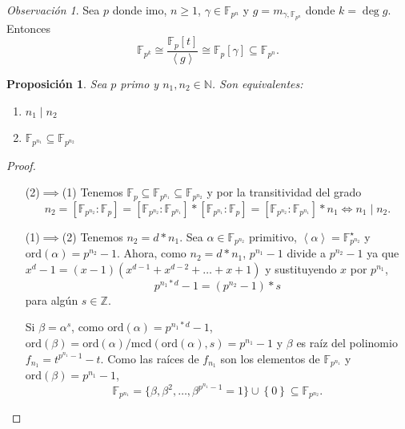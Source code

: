 \documentclass[10pt, spanish]{report}
\newtheorem{prop}[tma]{Proposición}
\theoremstyle{definition}
\theoremstyle{custom}
\theoremstyle{remark}
\newtheorem*{obs}{Observación}
\newcommand{\N}{\mathbb{N}}
\newcommand{\Z}{\mathbb{Z}}
\newcommand{\F}{\mathbb{F}}
\newcommand{\ord}[1]{\text{ord}(#1)}
\newcommand{\mcd}[1]{\text{mcd}(#1)}
\renewcommand{\geq}{\geqslant}
\newcommand{\fecha}[1]{\marginpar{\underline{\footnotesize{#1}}}}
\begin{document}
\fecha{22/03}
\begin{obs}
    Sea $p$ donde imo, $n\geq1$, $\gamma\in\F_{p^n}$ y $g=m_{\gamma,\F_{p^n}}$
    donde $k=\deg{g}$. Entonces \[\F_{p^k}\cong\frac{\F_p[t]}{\left< g \right>}
        \cong\F_p[\gamma]\subseteq\F_{p^n}.\]
\end{obs}

\begin{prop}\label{prop:subcuerposdiv}
    Sea $p$ primo y $n_1,n_2\in\N$. Son equivalentes:
    \begin{enumerate}
        \item $n_1\mid n_2$
        \item $\F_{p^{n_1}}\subseteq \F_{p^{n_2}}$
    \end{enumerate}
\end{prop}

\begin{proof}\hspace{0pt}
    \begin{itemize}[itemindent=36pt]
        \item[(2)$\implies$(1)] Tenemos $\F_p\subseteq\F_{p^{n_1}}\subseteq
            \F_{p^{n_2}}$ y por la transitividad del grado
            \[n_2=\left[ \F_{p^{n_2}}:\F_p \right]=
            \left[\F_{p^{n_2}}:\F_{p^{n_1}}\right]*
            \left[ \F_{p^{n_1}}:\F_p\right]=
            \left[\F_{p^{n_2}}:\F_{p^{n_1}}\right]*n_1
            \Leftrightarrow n_1\mid n_2.\]
        \item[(1)$\implies$(2)] Tenemos $n_2=d*n_1$. Sea $\alpha\in\F_{p^{n_2}}$
            primitivo, $\left< \alpha \right>=\F_{p^{n_2}}^\star$ y
            $\ord{\alpha}=p^{n_2}-1$. Ahora, como $n_2=d*n_1$, $p^{n_1}-1$
            divide a $p^{n_2}-1$ ya que
            $x^d-1=(x-1)(x^{d-1}+x^{d-2}+\ldots+x+1)$ y sustituyendo $x$ por
            $p^{n_1}$,
            \[p^{n_1*d}-1=(p^{n_2}-1)*s\]
            para algún $s\in\Z$.

            Si $\beta=\alpha^s$, como $\ord{\alpha}=p^{n_1*d}-1$, $\ord{
            \beta}={\ord{\alpha}}/{\mcd{\ord{\alpha},s}}=p^{n_1}-1$ y
            $\beta$ es raíz del polinomio $f_{n_1}=t^{p^{n_1}-1}-t$.
            Como las raíces de $f_{n_1}$ son los elementos de $\F_{p^{n_1}}$ y
            $\ord{\beta}=p^{n_1}-1$,
            \[\F_{p^{n_1}}=\{\beta,\beta^2,\ldots,\beta^{p^{n_1}-1}=1
            \}\cup \left\{ 0 \right\}\subseteq\F_{p^{n_2}}.\]
    \end{itemize}\vspace{-2.75em}
\end{proof}
\end{document}

